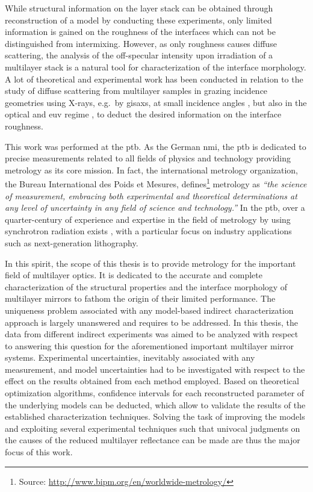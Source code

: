 While structural information on the layer stack can be obtained through reconstruction of a model by conducting these experiments, only limited information is gained on the roughness of the interfaces which can not be distinguished from intermixing. However, as only roughness causes diffuse scattering, the analysis of the off-specular intensity upon irradiation of a multilayer stack is a natural tool for characterization of the interface morphology. A lot of theoretical and experimental work has been conducted in relation to the study of diffuse scattering from multilayer samples in grazing incidence geometries using X-rays, e.g.~by \gls{gisaxs}, at small incidence angles \cite{mikulik_x-ray_1997, sinha_x-ray_1994, de_boer_x-ray_1995, de_boer_x-ray_1996, salditt_kinetic_1994, levine_grazing-incidence_1989,siffalovic_characterization_2009}, but also in the optical and \gls{euv} regime \cite{amra_light_1993, amra_light_1994, elson_light_1980, elson_relationship_1983, schroder_angle-resolved_2011, schroder_spectral_2014}, to deduct the desired information on the interface roughness.

This work was performed at the \gls{ptb}. As the German \gls{nmi}, the \gls{ptb} is dedicated to precise measurements related to all fields of physics and technology providing metrology as its core mission. In fact, the international metrology organization, the Bureau International des Poids et Mesures, defines\footnote{Source: \url{http://www.bipm.org/en/worldwide-metrology/}} metrology as \emph{``the science of measurement, embracing both experimental and theoretical determinations at any level of uncertainty in any field of science and technology.''} In the \gls{ptb}, over a quarter-century of experience and expertise in the field of metrology by using synchrotron radiation exists \cite{beckhoff_quarter-century_2009}, with a particular focus on industry applications such as next-generation lithography.

In this spirit, the scope of this thesis is to provide metrology for the important field of multilayer optics. It is dedicated to the accurate and complete characterization of the structural properties and the interface morphology of multilayer mirrors to fathom the origin of their limited performance. The uniqueness problem associated with any model-based indirect characterization approach is largely unanswered and requires to be addressed. In this thesis, the data from different indirect experiments was aimed to be analyzed with respect to answering this question for the aforementioned important multilayer mirror systems. Experimental uncertainties, inevitably associated with any measurement, and model uncertainties had to be investigated with respect to the effect on the results obtained from each method employed. Based on theoretical optimization algorithms, confidence intervals for each reconstructed parameter of the underlying models can be deducted, which allow to validate the results of the established characterization techniques. Solving the task of improving the models and exploiting several experimental techniques such that univocal judgments on the causes of the reduced multilayer reflectance can be made are thus the major focus of this work.

